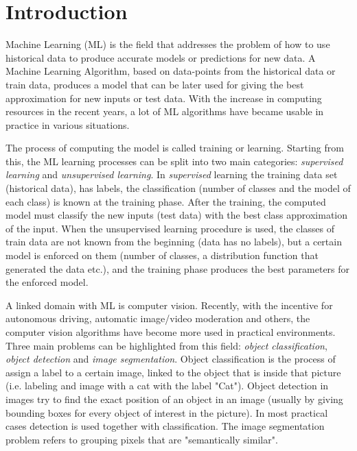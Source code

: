 \chapter*{Introduction}
Machine Learning (ML) is the field that addresses the problem of how to use historical data to produce accurate models or predictions for new data. A Machine Learning Algorithm, based on data-points from the historical data or train data, produces a model that can be later used for giving the best approximation for new inputs or test data. With the increase in computing resources in the recent years, a lot of ML algorithms have became usable in practice in various situations.

The process of computing the model is called training or learning. Starting from this, the ML learning processes can be split into two main categories: \textit{supervised learning} and \textit{unsupervised learning}. In \textit{supervised} learning the training data set (historical data), has labels, the classification (number of classes and the model of each class) is known at the training phase. After the training, the computed model must classify the new inputs (test data) with the best class approximation of the input. When the unsupervised learning procedure is used, the classes of train data are not known from the beginning (data has no labels), but a certain model is enforced on them (number of classes, a distribution function that generated the data etc.), and the training phase produces the best parameters for the enforced model.

A linked domain with ML is computer vision. Recently, with the incentive for autonomous driving, automatic image/video moderation and others, the computer vision algorithms have become more used in practical environments. Three main problems can be highlighted from this field: \textit{object classification}, \textit{object detection} and \textit{image segmentation}. Object classification is the process of assign a label to a certain image, linked to the object that is inside that picture (i.e. labeling and image with a cat with the label "Cat"). Object detection in images try to find the exact position of an object in an image (usually by giving bounding boxes for every object of interest in the picture). In most practical cases detection is used together with classification. The image segmentation problem refers to grouping pixels that are "semantically similar".

